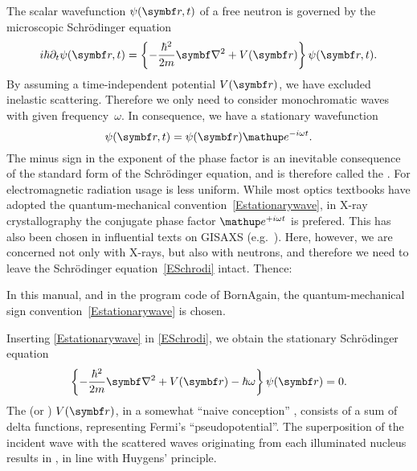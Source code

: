 %
The scalar wavefunction $\psi(\r,t)$
%
%
%
of a free neutron
is governed by the microscopic Schrödinger equation
\begin{equation}\label{ESchrodi}
  i\hbar\partial_t \psi(\r,t)
  = \left\{-\frac{\hbar^2}{2m}\Nabla^2+V(\r)\right\} \psi(\r,t).
\end{equation}
By assuming a time-independent potential $V(\r)$,
we have excluded inelastic scattering.
Therefore we only need to consider monochromatic waves
with given frequency~$\omega$.
%
In consequence, we have a stationary wavefunction
\begin{equation}\label{Estationarywave}
  \psi(\r,t) = \psi(\r)\e^{-i\omega t}.
\end{equation}
%
The minus sign in the exponent of the phase factor
is an inevitable consequence of the standard form of the Schrödinger equation,
and is therefore called the .
%
%
%
For electromagnetic radiation
usage is less uniform.
While most optics textbooks
have adopted the quantum-mechanical convention~\cref{Estationarywave},
in X-ray crystallography
the conjugate phase factor $\e^{+i\omega t}$ is prefered.
This  has also been chosen
in influential texts on GISAXS (e.g.\ \cite{ReLL09}).
Here, however, we are concerned not only with X-rays,
but also with neutrons,
and therefore we need to leave the Schrödinger equation~\cref{ESchrodi} intact.
Thence:

\Note
{\indent In this manual, and in the program code of BornAgain,
the quantum-mechanical sign convention~\cref{Estationarywave} is chosen.}
%

Inserting \cref{Estationarywave} in \cref{ESchrodi},
we obtain the stationary Schrödinger equation
\begin{equation}\label{EstatSchrodi}
  \left\{-\frac{\hbar^2}{2m}\Nabla^2+V(\r)-\hbar\omega\right\} \psi(\r) = 0.
\end{equation}
%
%
%
%
The  (or )
 $V(\r)$,
in a somewhat ``naive conception'' \cite[p.~7]{Sea89},
consists of a sum of delta functions,
representing Fermi's ``pseudopotential''.
%
The superposition of the incident wave with the scattered waves
originating from each illuminated nucleus
results in ,
%
in line with Huygens' principle.
%

